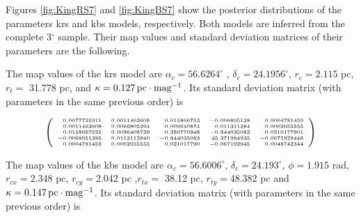 Figures \ref{fig:KingRS7} and \ref{fig:KingBS7} show the posterior distributions of the parameters \gls{krs} and \gls{kbs} models, respectively. Both models are inferred from the complete 3$^{\circ}$ sample. Their \gls{map} values and standard deviation matrices of their parameters are the following. 

The \gls{map} values of the \gls{krs} model are $\alpha_c=56.6264^{\circ}$ , $\delta_c=24.1956^{\circ}$, $r_{c}=2.115$ pc, $r_{t}=$ 31.778 pc, and $\kappa= 0.127\, \rm{pc \cdot mag^{-1}}$. Its standard deviation matrix (with parameters in the same previous order) is

$$
\tiny
\left(\begin{array}{rrrrr}
0.0077725911  & 0.0011463608 & 0.015866753 & -0.006895138 &0.0004781459\\
0.0011463608  & 0.0066805294 & 0.009640874 &  0.011311284  &0.0002655555\\
0.0158667525  & 0.0096408739 & 0.380770948& -0.844035083  & 0.0210177901\\
-0.0068951385 & 0.0113112840 & -0.844035083& 45.371984935&-0.0671929448\\
0.0004781459  & 0.0002655555 & 0.021017790& -0.067192945  &  0.0048742344\\
\end{array}\right)
$$

The \gls{map} values of the \gls{kbs} model are $\alpha_c=56.6006^{\circ}$, $\delta_c=24.193^{\circ}$, $\phi=1.915$ rad, $r_{cx}=2.348$ pc, $r_{cy}=$2.042 pc ,$r_{tx}=$ 38.12 pc, $r_{ty}=$48.382 pc  and $\kappa= 0.147\, \rm{pc \cdot mag^{-1}}$. Its standard deviation matrix (with parameters in the same previous order) is

